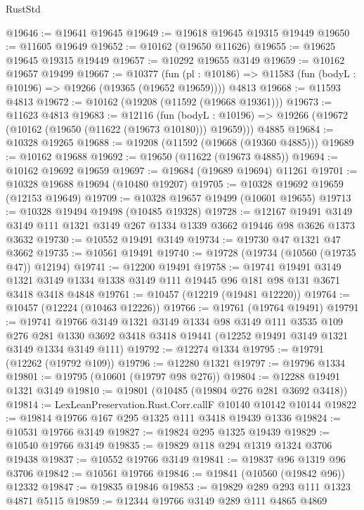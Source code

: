 \begin{lexlean}{RustStd}
\begin{coremodule}
@19646 := @19641 @19645
@19649 := @19618 @19645 @19315 @19449
@19650 := @11605 @19649
@19652 := @10162 (@19650 @11626)
@19655 := @19625 @19645 @19315 @19449
@19657 := @10292 @19655 @3149
@19659 := @10162 @19657 @19499
@19667 := @10377
    (fun (pl : @10186) => @11583 (fun (bodyL : @10196) => @19266 (@19365 (@19652 @19659))))
    @4813
@19668 := @11593 @4813
@19672 := @10162 (@19208 (@11592 (@19668 @19361)))
@19673 := @11623 @4813
@19683 := @12116
    (fun (bodyL : @10196) => @19266 (@19672 (@10162 (@19650 (@11622 (@19673 @10180))) @19659)))
    @4885
@19684 := @10328 @19265
@19688 := @19208 (@11592 (@19668 (@19360 @4885)))
@19689 := @10162 @19688
@19692 := @19650 (@11622 (@19673 @4885))
@19694 := @10162 @19692 @19659
@19697 := @19684 (@19689 @19694) @11261
@19701 := @10328 @19688 @19694 (@10480 @19207)
@19705 := @10328 @19692 @19659 (@12153 @19649)
@19709 := @10328 @19657 @19499 (@10601 @19655)
@19713 := @10328 @19494 @19498 (@10485 @19328)
@19728 := @12167
    @19491
    @3149
    @3149
    @111
    @1321
    @3149
    @267
    @1334
    @1339
    @3662
    @19446
    @98
    @3626
    @1373
    @3632
@19730 := @10552 @19491 @3149
@19734 := @19730 @47 @1321 @47 @3662
@19735 := @10561 @19491
@19740 := @19728 (@19734 (@10560 (@19735 @47)) @12194)
@19741 := @12200 @19491
@19758 := @19741
    @19491
    @3149
    @1321
    @3149
    @1334
    @1338
    @3149
    @111
    @19445
    @96
    @181
    @98
    @131
    @3671
    @3418
    @3418
    @4848
@19761 := @10457 (@12219 (@19481 @12220))
@19764 := @10457 (@12224 (@10463 @12226))
@19766 := @19761 (@19764 @19491)
@19791 := @19741
    @19766
    @3149
    @1321
    @3149
    @1334
    @98
    @3149
    @111
    @3535
    @109
    @276
    @281
    @1330
    @3692
    @3418
    @3418
    @19441
    (@12252 @19491 @3149 @1321 @3149 @1334 @3149 @111)
@19792 := @12274 @1334
@19795 := @19791 (@12262 (@19792 @109))
@19796 := @12280 @1321
@19797 := @19796 @1334
@19801 := @19795 (@10601 (@19797 @98 @276))
@19804 := @12288 @19491 @1321 @3149
@19810 := @19801 (@10485 (@19804 @276 @281 @3692 @3418))
@19814 := LexLeanPreservation.Rust.Corr.callF @10140 @10142 @10144
@19822 := @19814 @19766 @167 @295 @1325 @111 @3418 @19439 @1336
@19824 := @10531 @19766 @3149
@19827 := @19824 @295 @1325 @19439
@19829 := @10540 @19766 @3149
@19835 := @19829 @118 @294 @1319 @1324 @3706 @19438
@19837 := @10552 @19766 @3149
@19841 := @19837 @96 @1319 @96 @3706
@19842 := @10561 @19766
@19846 := @19841 (@10560 (@19842 @96)) @12332
@19847 := @19835 @19846
@19853 := @19829 @289 @293 @111 @1323 @4871 @5115
@19859 := @12344 @19766 @3149 @289 @111 @4865 @4869

\end{coremodule}
\end{lexlean}
